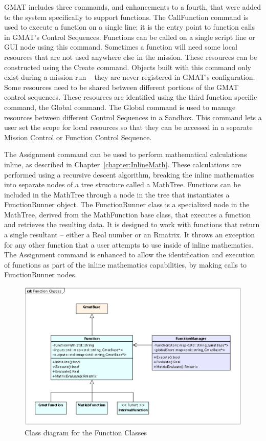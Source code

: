 GMAT includes three commands, and enhancements to a fourth, that were added to the system
specifically to support functions.  The CallFunction command is used to execute a function on a
single line; it is the entry point to function calls in GMAT's Control Sequences. Functions can be
called on a single script line or GUI node using this command.  Sometimes a function will need some
local resources that are not used anywhere else in the mission.  These resources can be constructed
using the Create command.  Objects built with this command only exist during a mission run -- they
are never registered in GMAT's configuration.  Some resources need to be shared between different
portions of the GMAT control sequences.  These resources are identified using the third function
specific command, the Global command.  The Global command is used to manage resources between
different Control Sequences in a Sandbox.  This command lets a user set the scope for local
resources so that they can be accessed in a separate Mission Control or Function Control Sequence.

The Assignment command can be used to perform mathematical calculations inline, as described in
Chapter~\ref{chapter:InlineMath}.  These calculations are performed using a recursive descent
algorithm, breaking the inline mathematics into separate nodes of a tree structure called a
MathTree.  Functions can be included in the MathTree through a node in the tree that instantiates
a FunctionRunner object.  The FunctionRunner class is a specialized node in the MathTree, derived
from the MathFunction base class, that executes a function and retrieves the resulting data.  It is
designed to work with functions that return a single resultant -- either a Real number or an
Rmatrix.  It throws an exception for any other function that a user attempts to use inside of
inline mathematics.  The Assignment command is enhanced to allow the identification and execution
of functions as part of the inline mathematics capabilities, by making calls to FunctionRunner
nodes.

\begin{figure}[htb]
\begin{center}
\includegraphics[scale=0.5]{Images/FunctionClasses.eps}
\caption{\label{figure:FunctionClassHierarchy}Class diagram for the Function Classes}
\end{center}
\end{figure}


